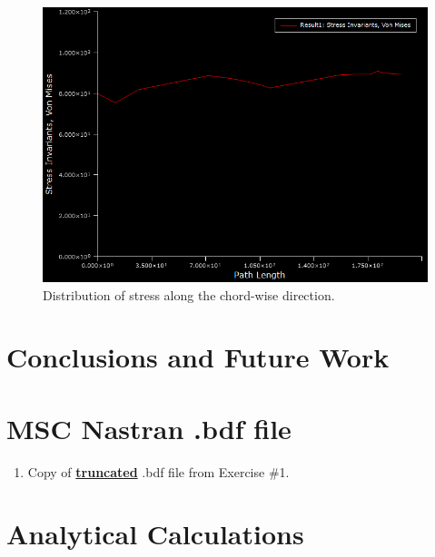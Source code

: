\documentclass[11pt,a4paper,oneside]{memoir}
\begin{document}
\begin{figure}[h]
    \centering
    \includegraphics[width = .8\textwidth]{figures/Path-length-one.png}
    \caption{Distribution of stress along the chord-wise direction.}
    \label{fig:stress-along-chord}
\end{figure}



\chapter{Conclusions and Future Work}


\appendix

\chapter{MSC Nastran .bdf file}\label{chap:a}
\begin{enumerate}
	\item Copy of \underline{\textbf{truncated}} .bdf file from Exercise \#1.
\end{enumerate}

\chapter{Analytical Calculations}\label{chap:b}



\end{document}
